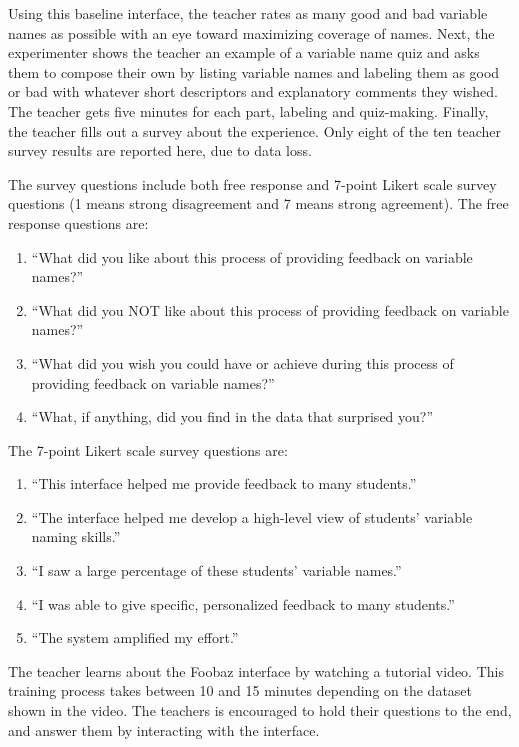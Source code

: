 Using this baseline interface, the teacher rates as many good and bad variable names as possible with an eye toward maximizing coverage of names. Next, the experimenter shows the teacher an example of a variable name quiz and asks them to compose their own by listing variable names and labeling them as good or bad with whatever short descriptors and explanatory comments they wished. The teacher gets five minutes for each part, labeling and quiz-making. Finally, the teacher fills out a survey about the experience. Only eight of the ten teacher survey results are reported here, due to data loss.

The survey questions include both free response and 7-point Likert scale survey questions (1 means strong disagreement and 7 means strong agreement). The free response questions are:
\begin{enumerate} 
\item ``What did you like about this process of providing feedback on variable names?''
\item ``What did you NOT like about this process of providing feedback on variable names?'' 
\item ``What did you wish you could have or achieve during this process of providing feedback on variable names?'' 
\item ``What, if anything, did you find in the data that surprised you?''
\end{enumerate}
The 7-point Likert scale survey questions are:
\begin{enumerate}
\item ``This interface helped me provide feedback to many students.''
\item ``The interface helped me develop a high-level view of students' variable naming skills.''
\item ``I saw a large percentage of these students' variable names.''
\item ``I was able to give specific, personalized feedback to many students.''
\item ``The system amplified my effort.''
\end{enumerate}


The teacher learns about the Foobaz interface by watching a tutorial video. This training process takes between 10 and 15 minutes depending on the dataset shown in the video. The teachers is encouraged to hold their questions to the end, and answer them by interacting with the interface.

